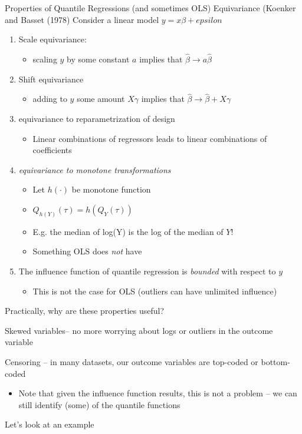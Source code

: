 \documentclass[notes,11pt, aspectratio=169]{beamer}
\newenvironment{wideitemize}{\itemize\addtolength{\itemsep}{10pt}}{\enditemize}
\begin{document}
\begin{frame}{Properties of Quantile Regressions (and sometimes OLS)}
  Equivariance (Koenker and Basset (1978)
  Consider a linear model $y = x\beta + epsilon$
  \begin{enumerate}
  \item Scale equivariance:
    \begin{itemize}
    \item scaling $y$ by some constant $a$ implies that $\hat{\beta} \rightarrow a\hat{\beta}$
    \end{itemize}
  \item Shift equivariance
    \begin{itemize}
    \item adding to $y$ some amount $X\gamma$ implies that $\hat{\beta} \rightarrow \hat{\beta} + X\gamma$
    \end{itemize}
  \item equivariance to reparametrization of design
    \begin{itemize}
    \item Linear combinations of regressors leads to linear combinations of coefficients
    \end{itemize}
  \item \emph{equivariance to monotone transformations}
    \begin{itemize}
      \item Let $h(\cdot)$ be monotone function
      \item $Q_{h(Y)}(\tau) = h(Q_{Y}(\tau))$
      \item E.g. the median of log(Y) is the log of the median of $Y$!
      \item Something OLS does \emph{not} have
      \end{itemize}
    \item The influence function of quantile regression is \emph{bounded} with respect to $y$
      \begin{itemize}
      \item This is not the case for OLS (outliers can have unlimited influence)
      \end{itemize}
  \end{enumerate}
\end{frame}

\begin{frame}{Practically, why are these properties useful?}
  \begin{wideitemize}
  \item Skewed variables-- no more worrying about logs or outliers in the outcome variable
  \item Censoring -- in many datasets, our outcome variables are top-coded or bottom-coded
    \begin{itemize}
    \item Note that given the influence function results, this is not
      a problem -- we can still identify (some) of the quantile
      functions
    \end{itemize}
  \item Let's look at an example
  \end{wideitemize}
\end{frame}
\end{document}

